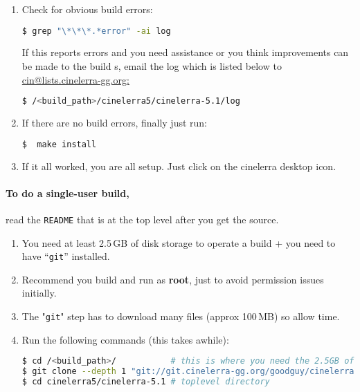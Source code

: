 \begin{enumerate}
        \begin{lstlisting}[language=bash]
$ ./blds/bld_prepare.sh <os> # where <os> represents the Operating System of centos, fedora, suse, leap, ubuntu, debian.
$ ./autogen.sh
$ ./configure --prefix=/usr  # optional parameters can be added here
$ make 2>&1 | tee log        # make and log the build
        \end{lstlisting}
    \item  Check for obvious build errors:
        \begin{lstlisting}[language=bash]
$ grep "\*\*\*.*error" -ai log
        \end{lstlisting}
        If this reports errors and you need assistance or you think improvements can be made to the build s,
        email the log which is listed below to \url{cin@lists.cinelerra-gg.org:}
        \begin{lstlisting}[language=bash]
$ /<build_path>/cinelerra5/cinelerra-5.1/log
        \end{lstlisting}
    \item  If there are no build errors, finally just run:
        \begin{lstlisting}[language=bash]
   $  make install
        \end{lstlisting}
    \item  If it all worked, you are all setup. Just click on the cinelerra desktop icon.
\end{enumerate}

\paragraph{To do a single-user build,} read the \texttt{README} that is at the top level after you get the source.
\begin{enumerate}
    \item  You need at least 2.5\,GB of disk storage to operate a build + you need to have  “\texttt{git}” installed.
    \item  Recommend you build and run as \textbf{root}, just to avoid permission issues initially.
    \item  The "\texttt{git}" step has to download many files (approx 100\,MB) so allow time.
    \item  Run the following commands (this takes awhile):
        \begin{lstlisting}[language=bash]
$ cd /<build_path>/           # this is where you need the 2.5GB of disk space
$ git clone --depth 1 "git://git.cinelerra-gg.org/goodguy/cinelerra.git" cinelerra5 
$ cd cinelerra5/cinelerra-5.1 # toplevel directory
        \end{lstlisting}
\end{enumerate}

